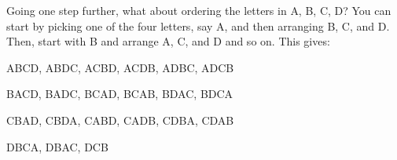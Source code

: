 \documentclass[10pt,]{book}
\numberwithin{equation}{section}
\begin{document}
\par
\hypertarget{p-361}{}%
Going one step further, what about ordering the letters in {A, B, C, D}? You can start by picking one of the four letters, say A, and then arranging B, C, and D.  Then, start with B and arrange A, C, and D and so on.  This gives:%
\par
\hypertarget{p-362}{}%
ABCD, ABDC, ACBD, ACDB, ADBC, ADCB%
\par
\hypertarget{p-363}{}%
BACD, BADC, BCAD, BCAB, BDAC, BDCA%
\par
\hypertarget{p-364}{}%
CBAD, CBDA, CABD, CADB, CDBA, CDAB%
\par
\hypertarget{p-365}{}%
DBCA, DBAC, DCB
\end{document}
